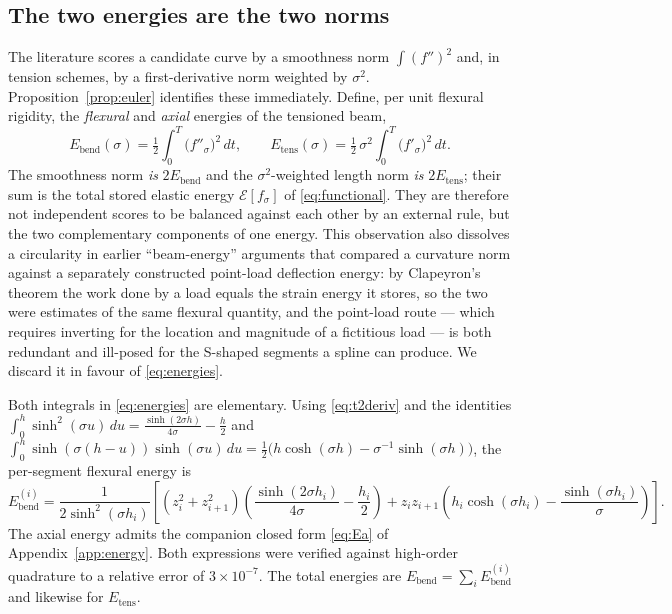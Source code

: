 \documentclass[]{interact}
\theoremstyle{plain}
\begin{document}
\subsection{The two energies are the two norms}
The literature scores a candidate curve by a smoothness norm $\int(f'')^2$ and, in tension
schemes, by a first-derivative norm weighted by $\sigma^2$. Proposition~\ref{prop:euler}
identifies these immediately. Define, per unit flexural rigidity, the \emph{flexural} and
\emph{axial} energies of the tensioned beam,
\begin{equation}
E_{\mathrm{bend}}(\sigma)=\tfrac12\!\int_0^T\!\big(f''_\sigma\big)^2\,dt,
\qquad
E_{\mathrm{tens}}(\sigma)=\tfrac12\,\sigma^2\!\int_0^T\!\big(f'_\sigma\big)^2\,dt .
\label{eq:energies}
\end{equation}
The smoothness norm \emph{is} $2E_{\mathrm{bend}}$ and the $\sigma^2$-weighted length norm
\emph{is} $2E_{\mathrm{tens}}$; their sum is the total stored elastic energy
$\mathcal{E}[f_\sigma]$ of \eqref{eq:functional}. They are therefore not independent scores to
be balanced against each other by an external rule, but the two complementary components of one
energy. This observation also dissolves a circularity in earlier ``beam-energy'' arguments that
compared a curvature norm against a separately constructed point-load deflection energy: by
Clapeyron's theorem the work done by a load equals the strain energy it stores, so the two were
estimates of the same flexural quantity, and the point-load route --- which requires inverting
for the location and magnitude of a fictitious load --- is both redundant and ill-posed for the
S-shaped segments a spline can produce. We discard it in favour of \eqref{eq:energies}.

Both integrals in \eqref{eq:energies} are elementary. Using \eqref{eq:t2deriv} and the
identities $\int_0^h\sinh^2(\sigma u)\,du=\tfrac{\sinh(2\sigma h)}{4\sigma}-\tfrac h2$ and
$\int_0^h\sinh(\sigma(h-u))\sinh(\sigma u)\,du=\tfrac12\big(h\cosh(\sigma h)-\sigma^{-1}\sinh(\sigma h)\big)$,
the per-segment flexural energy is
\begin{equation}
E^{(i)}_{\mathrm{bend}}=\frac{1}{2\sinh^2(\sigma h_i)}
\left[(z_i^2+z_{i+1}^2)\!\left(\frac{\sinh(2\sigma h_i)}{4\sigma}-\frac{h_i}{2}\right)
+z_i z_{i+1}\!\left(h_i\cosh(\sigma h_i)-\frac{\sinh(\sigma h_i)}{\sigma}\right)\right].
\label{eq:Eb}
\end{equation}
The axial energy admits the companion closed form \eqref{eq:Ea} of Appendix~\ref{app:energy}. Both expressions were verified against high-order quadrature to a
relative error of $3\times10^{-7}$. The total energies are
$E_{\mathrm{bend}}=\sum_i E^{(i)}_{\mathrm{bend}}$ and likewise for $E_{\mathrm{tens}}$.
\end{document}
